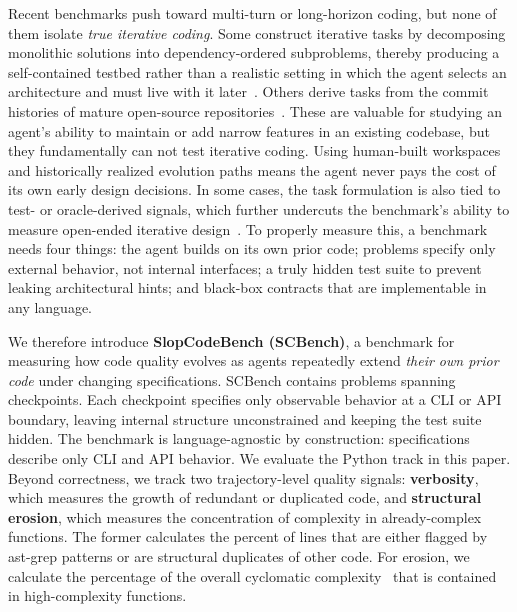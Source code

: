 Recent benchmarks push toward multi-turn or long-horizon coding, but none of them isolate \emph{true iterative coding}. Some construct iterative tasks by decomposing monolithic solutions into dependency-ordered subproblems, thereby producing a self-contained testbed rather than a realistic setting in which the agent selects an architecture and must live with it later~\citep{codeflowbench}. Others derive tasks from the commit histories of mature open-source repositories~\citep{thai2025-swe-evo,evoclaw,swe-ci}. These are valuable for studying an agent's ability to maintain or add narrow features in an existing codebase, but they fundamentally can not test iterative coding. Using human-built workspaces and historically realized evolution paths means the agent never pays the cost of its own early design decisions. In some cases, the task formulation is also tied to test- or oracle-derived signals, which further undercuts the benchmark's ability to measure open-ended iterative design~\citep{swe-ci}. To properly measure this, a benchmark needs four things: the agent builds on its own prior code; problems specify only external behavior, not internal interfaces; a truly hidden test suite to prevent leaking architectural hints; and black-box contracts that are implementable in any language.

We therefore introduce \textbf{SlopCodeBench (SCBench)}, a benchmark for measuring how code quality evolves as agents repeatedly extend \emph{their own prior code} under changing specifications. SCBench contains \transProblems{} problems spanning \overallTotalCheckpoints{} checkpoints. Each checkpoint specifies only observable behavior at a CLI or API boundary, leaving internal structure unconstrained and keeping the test suite hidden. The benchmark is language-agnostic by construction: specifications describe only CLI and API behavior. We evaluate the Python track in this paper. Beyond correctness, we track two trajectory-level quality signals: \textbf{verbosity}, which measures the growth of redundant or duplicated code, and \textbf{structural erosion}, which measures the concentration of complexity in already-complex functions. The former calculates the percent of lines that are either flagged by ast-grep patterns or are structural duplicates of other code. For erosion, we calculate the percentage of the overall cyclomatic complexity~\citep{mccabe1976-complexity} that is contained in high-complexity functions. 

